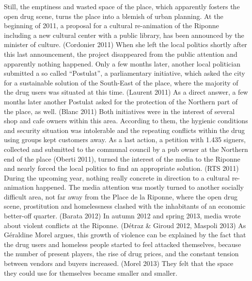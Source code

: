 \documentclass[a4paper,
fontsize=11pt,
oneside,
numbers=noperiodatend,
parskip=half-,
bibliography=totoc,
final
]{scrartcl}
\begin{document}
Still, the emptiness and wasted space of the place, which apparently
fosters the open drug scene, turns the place into a blemish of urban
planning. At the beginning of 2011, a proposal for a cultural
re-animation of the Riponne including a new cultural center with a
public library, has been announced by the minister of culture.
(Cordonier 2011) When she left the local politics shortly after this
last announcement, the project disappeared from the public attention and
apparently nothing happened. Only a few months later, another local
politician submitted a so called \enquote{Postulat}, a parliamentary
initiative, which asked the city for a sustainable solution of the
South-East of the place, where the majority of the drug users was
situated at this time. (Laurent 2011) As a direct answer, a few months
later another Postulat asked for the protection of the Northern part of
the place, as well. (Blanc 2011) Both initiatives were in the interest
of several shop and cafe owners within this area. According to them, the
hygienic conditions and security situation was intolerable and the
repeating conflicts within the drug using groups kept customers away. As
a last action, a petition with 1.435 signers, collected and submitted to
the communal council by a pub owner at the Northern end of the place
(Oberti 2011), turned the interest of the media to the Riponne and
nearly forced the local politics to find an appropriate solution. (RTS
2011) During the upcoming year, nothing really concrete in direction to
a cultural re-animation happened. The media attention was mostly turned
to another socially difficult area, not far away from the Place de la
Riponne, where the open drug scene, prostitution and homelessness
clashed with the inhabitants of an economic better-off quarter. (Barata
2012) In autumn 2012 and spring 2013, media wrote about violent
conflicts at the Riponne. (Détraz \& Giroud 2012, Maspoli 2013) As
Géraldine Morel argues, this growth of violence can be explained by the
fact that the drug users and homeless people started to feel attacked
themselves, because the number of present players, the rise of drug
prices, and the constant tension between vendors and buyers increased.
(Morel 2013) They felt that the space they could use for themselves
became smaller and smaller.
\end{document}
